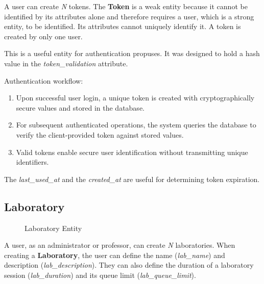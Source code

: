 A user can create \textit{N} tokens. The \textbf{Token} is a weak entity because it cannot be identified by its attributes alone and therefore requires a user, which is a strong entity, to be identified. Its attributes cannot uniquely identify it. A token is created by only one user.

This is a useful entity for authentication propuses. It was designed to hold a hash value in the \textit{token\_validation} attribute.

Authentication workflow:

\begin{enumerate}
    \item Upon successful user login, a unique token is created with cryptographically secure values and stored in the database.
    \item For subsequent authenticated operations, the system queries the database to verify the client-provided token against stored values.
    \item Valid tokens enable secure user identification without transmitting unique identifiers.
\end{enumerate}

The \textit{last\_used\_at} and the \textit{created\_at} are useful for determining token expiration.

\subsection*{Laboratory}

\begin{figure}[h]
    \begin{center}
    \end{center}
    \caption{Laboratory Entity}
    \label{fig:laboratory_entity}
\end{figure}

A user, as an administrator or professor, can create \textit{N} laboratories. When creating a \textbf{Laboratory}, the user can define the name (\textit{lab\_name}) and description (\textit{lab\_description}). They can also define the duration of a laboratory session (\textit{lab\_duration}) and its queue limit (\textit{lab\_queue\_limit}).

